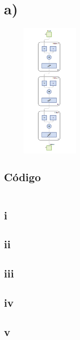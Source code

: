 \documentclass[a4paper, 12pt]{article}
\begin{document}
    \section{a)}
	
	\begin{figure}[htp!]
		\centering
		\includegraphics[width=0.25\textwidth]{figures/red.png}
	\end{figure}
	
	
	\subsection{Código}
	\inputminted[fontsize=\scriptsize, linenos, breaklines=true, xleftmargin=0.75cm, frame=lines]{matlab}{code/red,png}
    
        \subsection{i}
        
        \subsection{ii}
        
        \subsection{iii}
        
        \subsection{iv}
        
        \subsection{v}
        
\end{document}
